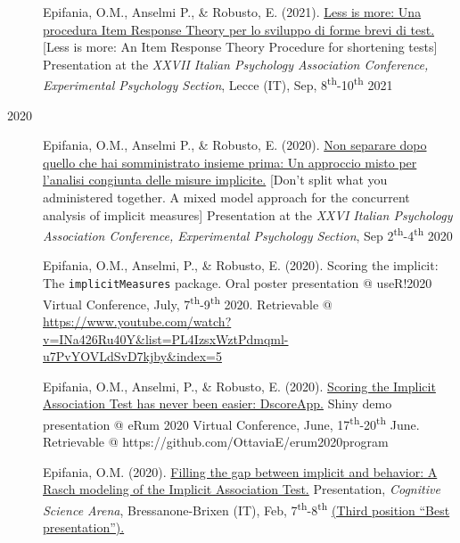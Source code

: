 \documentclass[letterpaper,12pt]{article}
\begin{document}
\begin{description}
		\item[] Epifania, O.M., Anselmi P., \& Robusto, E. (2021). \href{https://ottaviae.github.io/presentations/2021/Less-is-more.pdf}{Less is more: Una procedura Item Response Theory per lo sviluppo di forme brevi di test.} [Less is more: An Item Response Theory Procedure for shortening tests] Presentation at the \emph{XXVII Italian Psychology Association Conference, Experimental Psychology Section}, Lecce (IT), Sep, 8\textsuperscript{th}-10\textsuperscript{th} 2021
		
		\item[2020] 
		

	
	\item[] 	Epifania, O.M., Anselmi P., \& Robusto, E. (2020). \href{https://ottaviae.github.io/presentations/2020/EpifaniaSimposioS4.pdf}{Non separare dopo quello che hai somministrato insieme prima: Un approccio misto per l’analisi congiunta delle misure implicite.} [Don't split what you administered together. A mixed model approach for the concurrent analysis of implicit measures] Presentation at the \emph{XXVI Italian Psychology Association Conference, Experimental Psychology Section}, Sep 2\textsuperscript{th}-4\textsuperscript{th} 2020
	
	\item[] 	Epifania, O.M., Anselmi, P., \& Robusto, E. (2020). Scoring the implicit: The \texttt{implicitMeasures} package. Oral poster presentation @ useR!2020 Virtual Conference, July, 7\textsuperscript{th}-9\textsuperscript{th}  2020.  Retrievable @ \href{https://www.youtube.com/watch?v=INa426Ru40Y&list=PL4IzsxWztPdmqml-u7PvYOVLdSvD7kjby&index=5}{https://www.youtube.com/watch?v=INa426Ru40Y\&list=PL4IzsxWztPdmqml-u7PvYOVLdSvD7kjby\&index=5}
	
	\item[] 	Epifania, O.M., Anselmi, P., \& Robusto, E. (2020). \href{https://github.com/OttaviaE/eRum2020/blob/master/eRumShinyDemo-Epifania.Rmd}{Scoring the Implicit Association Test has never been easier: DscoreApp.} Shiny demo presentation @ eRum 2020 Virtual Conference, June, 17\textsuperscript{th}-20\textsuperscript{th} June. Retrievable @ https://github.com/OttaviaE/erum2020program
	
	\item[]  Epifania, O.M. (2020). \href{https://ottaviae.github.io/presentations/2020/brixen.pdf}{Filling the gap between implicit and behavior: A Rasch modeling of the Implicit Association Test.} Presentation, \emph{Cognitive Science Arena}, Bressanone-Brixen (IT), Feb, 7\textsuperscript{th}-8\textsuperscript{th} \underline{(Third position ``Best presentation'').}
	

\end{description}
\end{document}

